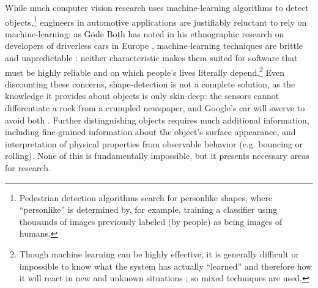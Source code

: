 

While much computer vision research uses machine-learning algorithms to detect
objects,\footnote{Pedestrian detection algorithms search for
  personlike shapes, where ``personlike'' is determined by, for
  example, training a classifier using thousands of images previously
  labeled (by people) as being images of humans.} engineers in
automotive applications are justifiably 
reluctant to rely on machine-learning: as G\"{o}de Both has noted in his
ethnographic research on developers of driverless cars in
Europe \cite{bothpt1},
machine-learning techniques are brittle and unpredictable \cite{bothpt2}: neither
characteristic makes them suited for software that must be highly
reliable and on which people's lives literally depend.\footnote{Though machine
learning can be highly effective, it is generally difficult or
impossible to know what the 
system has actually ``learned'' and therefore how it will react in new
and unknown situations \cite{bothpt2}; so mixed techniques are used.}
Even discounting these concerns, shape-detection is not a complete
solution, as the knowledge it provides about objects is only
skin-deep: the sensors cannot differentiate a rock from a crumpled
newspaper, and Google's car will swerve to avoid
both \cite{gomesCircles}. Further distinguishing objects requires much
additional information,
including fine-grained information about the object's surface
appearance, and interpretation of physical properties from observable
behavior (e.g. bouncing or rolling). None of this is fundamentally
impossible, but it presents necessary areas for research.

